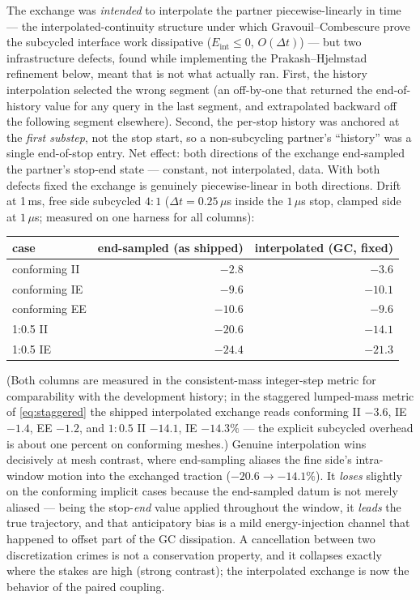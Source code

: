 \documentclass[11pt]{article}
\begin{document}
The exchange was \emph{intended} to interpolate the partner
piecewise-linearly in time --- the interpolated-continuity structure under
which Gravouil--Combescure prove the subcycled interface work dissipative
($E_{\mathrm{int}} \le 0$, $O(\Delta t)$) --- but two infrastructure
defects, found while implementing the Prakash--Hjelmstad refinement below,
meant that is not what actually ran. First, the history interpolation
selected the wrong segment (an off-by-one that returned the end-of-history
value for any query in the last segment, and extrapolated backward off the
following segment elsewhere). Second, the per-stop history was anchored at
the \emph{first substep}, not the stop start, so a non-subcycling
partner's ``history'' was a single end-of-stop entry. Net effect: both
directions of the exchange end-sampled the partner's stop-end state ---
constant, not interpolated, data. With both defects fixed the exchange is
genuinely piecewise-linear in both directions. Drift at 1\,ms, free side
subcycled $4{:}1$ ($\Delta t = 0.25\,\mu$s inside the $1\,\mu$s stop,
clamped side at $1\,\mu$s; measured on one harness for all columns):

\begin{center}
\begin{tabular}{lrr}
\toprule
case & end-sampled (as shipped) & interpolated (GC, fixed) \\
\midrule
conforming II & $-2.8$ & $-3.6$ \\
conforming IE & $-9.6$ & $-10.1$ \\
conforming EE & $-10.6$ & $-9.6$ \\
1:0.5 II & $-20.6$ & $\mathbf{-14.1}$ \\
1:0.5 IE & $-24.4$ & $\mathbf{-21.3}$ \\
\bottomrule
\end{tabular}
\end{center}

(Both columns are measured in the consistent-mass integer-step metric for
comparability with the development history; in the staggered lumped-mass
metric of \eqref{eq:staggered} the shipped interpolated exchange reads
conforming II $-3.6$, IE $-1.4$, EE $-1.2$, and $1{:}0.5$ II $-14.1$,
IE $-14.3\%$ --- the explicit subcycled overhead is about one percent on
conforming meshes.) Genuine interpolation wins decisively at mesh contrast,
where end-sampling aliases the fine side's intra-window motion into the
exchanged traction ($-20.6 \to -14.1\%$). It \emph{loses} slightly on the conforming implicit
cases because the end-sampled datum is not merely aliased --- being the
stop-\emph{end} value applied throughout the window, it \emph{leads} the
true trajectory, and that anticipatory bias is a mild energy-injection
channel that happened to offset part of the GC dissipation. A cancellation
between two discretization crimes is not a conservation property, and it
collapses exactly where the stakes are high (strong contrast); the
interpolated exchange is now the behavior of the paired coupling.
\end{document}
